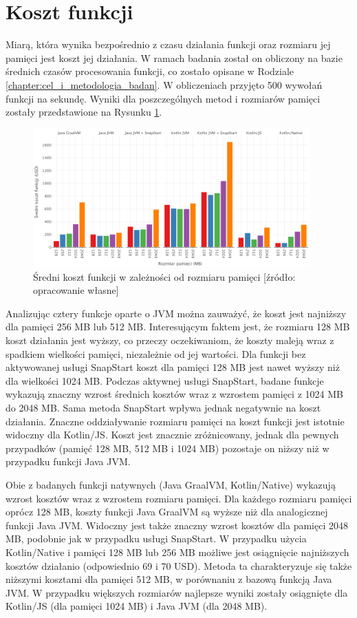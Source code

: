 \section{Koszt funkcji}\label{chapter:results_cost}

Miarą, która wynika bezpośrednio z czasu działania funkcji oraz rozmiaru jej pamięci jest koszt jej działania.
W ramach badania został on obliczony na bazie średnich czasów procesowania funkcji, co zostało opisane w Rodziale \ref{chapter:cel_i_metodologia_badan}.
W obliczeniach przyjęto 500 wywołań funkcji na sekundę.
Wyniki dla poszczególnych metod i rozmiarów pamięci zostały przedstawione na Rysunku \ref{fig:avg_costs}.

\begin{figure}[h]
    \centering
    \includegraphics[width=0.95\textwidth]{charts/results/average-cost.png}
    \caption{Średni koszt funkcji w zależności od rozmiaru pamięci [źródło: opracowanie własne]}
    \label{fig:avg_costs}
\end{figure}

Analizując cztery funkcje oparte o JVM można zauważyć, że koszt jest najniższy dla pamięci 256 MB lub 512 MB.
Interesującym faktem jest, że rozmiaru 128 MB koszt działania jest wyższy, co przeczy oczekiwaniom, że koszty maleją wraz z spadkiem wielkości pamięci, niezależnie od jej wartości.
Dla funkcji bez aktywowanej usługi SnapStart koszt dla pamięci 128 MB jest nawet wyższy niż dla wielkości 1024 MB.
Podczas aktywnej usługi SnapStart, badane funkcje wykazują znaczny wzrost średnich kosztów wraz z wzrostem pamięci z 1024 MB do 2048 MB.
Sama metoda SnapStart wpływa jednak negatywnie na koszt działania.
Znaczne oddziaływanie rozmiaru pamięci na koszt funkcji jest istotnie widoczny dla Kotlin/JS.
Koszt jest znacznie zróżnicowany, jednak dla pewnych przypadków (pamięć 128 MB, 512 MB i 1024 MB) pozostaje on niższy niż w przypadku funkcji Java JVM.

Obie z badanych funkcji natywnych (Java GraalVM, Kotlin/Native) wykazują wzrost kosztów wraz z wzrostem rozmiaru pamięci.
Dla każdego rozmiaru pamięci oprócz 128 MB, koszty funkcji Java GraalVM są wyższe niż dla analogicznej funkcji Java JVM.
Widoczny jest także znaczny wzrost kosztów dla pamięci 2048 MB, podobnie jak w przypadku usługi SnapStart.
W przypadku użycia Kotlin/Native i pamięci 128 MB lub 256 MB możliwe jest osiągnięcie najniższych kosztów działanio (odpowiednio 69 i 70 USD).
Metoda ta charakteryzuje się także niższymi kosztami dla pamięci 512 MB, w porównaniu z bazową funkcją Java JVM.
W przypadku większych rozmiarów najlepsze wyniki zostały osiągnięte dla Kotlin/JS (dla pamięci 1024 MB) i Java JVM (dla 2048 MB).
